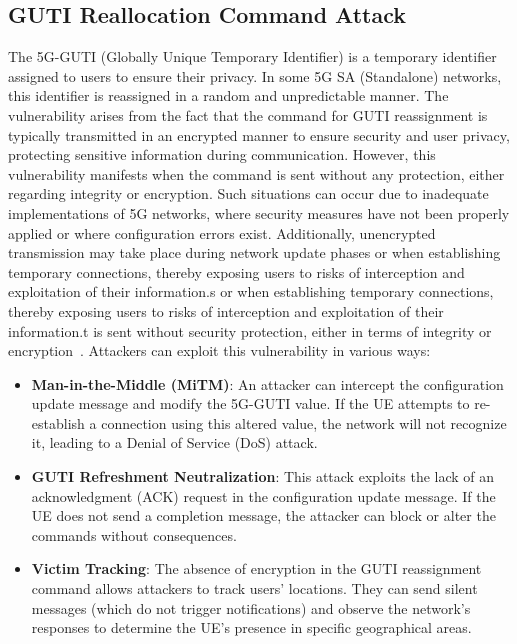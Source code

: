 \documentclass[english]{article}
\begin{document}
\subsection{GUTI Reallocation Command Attack}
The 5G-GUTI (Globally Unique Temporary Identifier) is a temporary identifier
assigned to users to ensure their privacy. In some 5G SA (Standalone) networks,
this identifier is reassigned in a random and unpredictable manner. The
vulnerability arises from the fact that the command for GUTI reassignment is
typically transmitted in an encrypted manner to ensure security and user
privacy, protecting sensitive information during communication. However, this
vulnerability manifests when the command is sent without any protection, either
regarding integrity or encryption. Such situations can occur due to inadequate
implementations of 5G networks, where security measures have not been properly
applied or where configuration errors exist. Additionally, unencrypted
transmission may take place during network update phases or when establishing
temporary connections, thereby exposing users to risks of interception and
exploitation of their information.s or when establishing temporary connections,
thereby exposing users to risks of interception and exploitation of their
information.t is sent without security protection, either in terms of integrity
or encryption~\cite{eleftherakis2024demystifying}. Attackers can exploit this
vulnerability in various ways:
\begin{itemize}
	\item \textbf{Man-in-the-Middle (MiTM)}:
	      An attacker can intercept the configuration update message
	      and modify the 5G-GUTI value. If the UE attempts to re-establish
	      a connection using this altered value, the network will not recognize
	      it, leading to a Denial of Service (DoS) attack.
	\item \textbf{GUTI Refreshment Neutralization}:
	      This attack exploits the lack of an acknowledgment (ACK)
	      request in the configuration update message. If the UE does
	      not send a completion message, the attacker can block or alter
	      the commands without consequences.
	\item \textbf{Victim Tracking}:
	      The absence of encryption in the GUTI reassignment command
	      allows attackers to track users' locations. They can send
	      silent messages (which do not trigger notifications) and
	      observe the network's responses to determine the UE's
	      presence in specific geographical areas.
\end{itemize}
\end{document}
